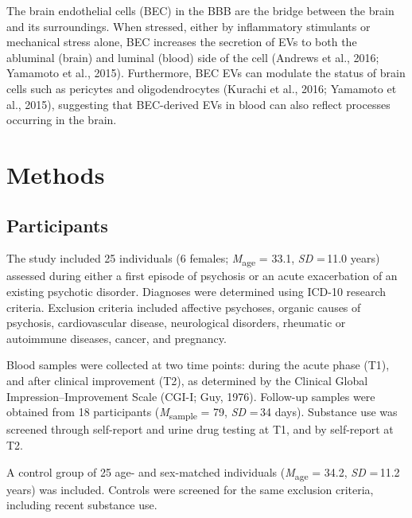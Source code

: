 \documentclass[authordate, empirical]{jote-new-article}
\begin{document}
	The brain endothelial cells (BEC) in the BBB are the bridge between the brain and its surroundings. When stressed, either by inflammatory stimulants or mechanical stress alone, BEC increases the secretion of EVs to both the abluminal (brain) and luminal (blood) side of the cell (Andrews et al., 2016; Yamamoto et al., 2015). Furthermore, BEC EVs can modulate the status of brain cells such as pericytes and oligodendrocytes (Kurachi et al., 2016; Yamamoto et al., 2015), suggesting that BEC-derived EVs in blood can also reflect processes occurring in the brain.











	\section{Methods}



	\subsection{Participants}



	The study included 25 individuals (6 females; \emph{M}\textsubscript{age} = 33.1, \emph{SD }= 11.0 years) assessed during either a first episode of psychosis or an acute exacerbation of an existing psychotic disorder. Diagnoses were determined using ICD-10 research criteria. Exclusion criteria included affective psychoses, organic causes of psychosis, cardiovascular disease, neurological disorders, rheumatic or autoimmune diseases, cancer, and pregnancy.







	Blood samples were collected at two time points: during the acute phase (T1), and after clinical improvement (T2), as determined by the Clinical Global Impression--Improvement Scale (CGI-I; Guy, 1976). Follow-up samples were obtained from 18 participants (\emph{M}\textsubscript{sample} = 79, \emph{SD }= 34 days). Substance use was screened through self-report and urine drug testing at T1, and by self-report at T2.







	A control group of 25 age- and sex-matched individuals (\emph{M}\textsubscript{age} = 34.2, \emph{SD }= 11.2 years) was included. Controls were screened for the same exclusion criteria, including recent substance use.
\end{document}
